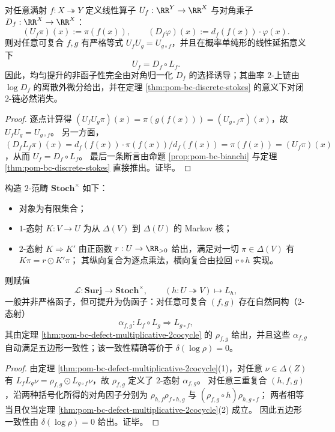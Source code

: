 \begin{proposition}[线性化严格函子性与规范平直化]\label{prop:pom-bc-linearized-functoriality}
对任意满射 \(f:X\twoheadrightarrow Y\) 定义线性算子 \(U_f:\RR^Y\to\RR^X\) 与对角乘子 \(D_f:\RR^X\to\RR^X\)：
\[
(U_f\pi)(x):=\pi(f(x)),\qquad (D_f\varphi)(x):=d_f(f(x))\cdot \varphi(x).
\]
则对任意可复合 \(f,g\) 有严格等式 \(U_fU_g=U_{g\circ f}\)，并且在概率单纯形的线性延拓意义下
\[
\boxed{\;U_f=D_f\circ L_f.\;}
\]
因此，均匀提升的非函子性完全由对角归一化 \(D_f\) 的选择诱导；其曲率 \(2\)-上链由 \(\log D_f\) 的离散外微分给出，并在定理 \ref{thm:pom-bc-discrete-stokes} 的意义下对闭 \(2\)-链必然消失。
\end{proposition}
\begin{proof}
逐点计算得
\(
(U_fU_g\pi)(x)=\pi(g(f(x)))=(U_{g\circ f}\pi)(x)
\)，故 \(U_fU_g=U_{g\circ f}\)。
另一方面，
\(
(D_fL_f\pi)(x)=d_f(f(x))\cdot \pi(f(x))/d_f(f(x))=\pi(f(x))=(U_f\pi)(x)
\)，从而 \(U_f=D_f\circ L_f\)。
最后一条断言由命题 \ref{prop:pom-bc-bianchi} 与定理 \ref{thm:pom-bc-discrete-stokes} 直接推出。证毕。
\end{proof}

\begin{theorem}\label{thm:pom-bc-uniform-lift-pseudofunctor}
构造 \(2\)-范畴 \(\mathbf{Stoch}^{\times}\) 如下：
\begin{itemize}
  \item 对象为有限集合；
  \item \(1\)-态射 \(K:V\to U\) 为从 \(\Delta(V)\) 到 \(\Delta(U)\) 的 Markov 核；
  \item \(2\)-态射 \(K\Rightarrow K'\) 由正函数 \(r:U\to\RR_{>0}\) 给出，满足对一切 \(\pi\in\Delta(V)\) 有 \(K\pi=r\odot K'\pi\)；
  其纵向复合为逐点乘法，横向复合由拉回 \(r\circ h\) 实现。
\end{itemize}
则赋值
\[
\mathcal L:\mathbf{Surj}\longrightarrow \mathbf{Stoch}^{\times},\qquad
(h:U\twoheadrightarrow V)\longmapsto L_h,
\]
一般并非严格函子，但可提升为伪函子：对任意可复合 \((f,g)\) 存在自然同构（\(2\)-态射）
\[
\alpha_{f,g}:L_f\circ L_g\Longrightarrow L_{g\circ f},
\]
其由定理 \ref{thm:pom-bc-defect-multiplicative-2cocycle} 的 \(\rho_{f,g}\) 给出，并且这些 \(\alpha_{f,g}\) 自动满足五边形一致性；该一致性精确等价于 \(\delta(\log\rho)=0\)。
\end{theorem}
\begin{proof}
由定理 \ref{thm:pom-bc-defect-multiplicative-2cocycle}(1)，对任意 \(\nu\in\Delta(Z)\) 有
\(
L_fL_g\nu=\rho_{f,g}\odot L_{g\circ f}\nu
\)，故 \(\rho_{f,g}\) 定义了 \(2\)-态射 \(\alpha_{f,g}\)。
对任意三重复合 \((h,f,g)\)，沿两种括号化所得的对角因子分别为
\(\rho_{h,f}\rho_{f\circ h,g}\) 与 \((\rho_{f,g}\circ h)\rho_{h,g\circ f}\)；
两者相等当且仅当定理 \ref{thm:pom-bc-defect-multiplicative-2cocycle}(2) 成立。
因此五边形一致性由 \(\delta(\log\rho)=0\) 给出。证毕。
\end{proof}

